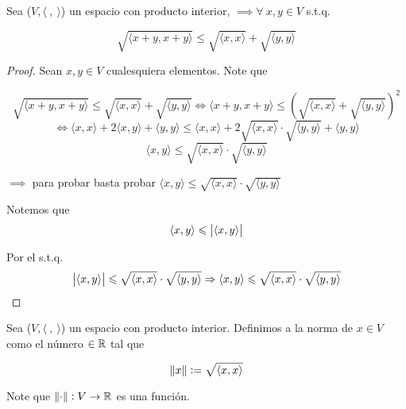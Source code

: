 \begin{theorem} \label{theom4}
    Sea ($V, \langle \: , \: \rangle$) un espacio con producto interior, $ \implies  \forall \: x,y \in V$ s.t.q.

    \begin{equation*}
        \sqrt{\langle x + y, x + y \rangle} \leqslant \sqrt{\langle x,x \rangle} + \sqrt{\langle y,y \rangle}
    \end{equation*}
\end{theorem}

\begin{proof}
    Sean $x, y \in V$ cualesquiera elementos. Note que

    \begin{equation*}
         \sqrt{\langle x + y, x + y \rangle} \leqslant \sqrt{\langle x,x \rangle} + \sqrt{\langle y,y \rangle} \Leftrightarrow \langle x + y, x + y \rangle \leqslant {(\sqrt{\langle x,x \rangle} + \sqrt{\langle y,y \rangle})}^{2}
    \end{equation*}
    \begin{equation*}
        \Leftrightarrow \langle x , x \rangle + 2 \langle x ,y \rangle + \langle y , y \rangle \leqslant \langle x , x \rangle + 2 \sqrt{\langle x,x \rangle} \cdot \sqrt{\langle y,y \rangle} + \langle y , y \rangle 
    \end{equation*}
    \begin{equation*}
        \langle x,y \rangle \leqslant \sqrt{\langle x,x \rangle} \cdot \sqrt{\langle y,y \rangle}
    \end{equation*}

    $\implies$ para probar  basta probar $\langle x,y \rangle \leqslant \sqrt{\langle x,x \rangle} \cdot \sqrt{\langle y,y \rangle}$

    Notemos que
    \begin{equation*}
        \langle x,y \rangle \leqslant \abs{\langle x,y \rangle}
    \end{equation*}

    Por el  s.t.q.
    \begin{equation*}
        \abs{\langle x,y \rangle} \leqslant \sqrt{\langle x,x \rangle} \cdot \sqrt{\langle y,y \rangle} \Rightarrow \langle x,y \rangle \leqslant \sqrt{\langle x,x \rangle} \cdot \sqrt{\langle y,y \rangle}
    \end{equation*}
\end{proof}

\begin{definition} \label{def14}
    Sea ($V, \langle \: , \: \rangle$) un espacio con producto interior. Definimos a la norma de $x \in V$ como el número $\in \mathbb{R}$ tal que

    \begin{equation*}
        \norm{x} := \sqrt{\langle x,x \rangle}
    \end{equation*}

    Note que $\norm{\cdot} : V \to \mathbb{R}$ es una función.
\end{definition}

